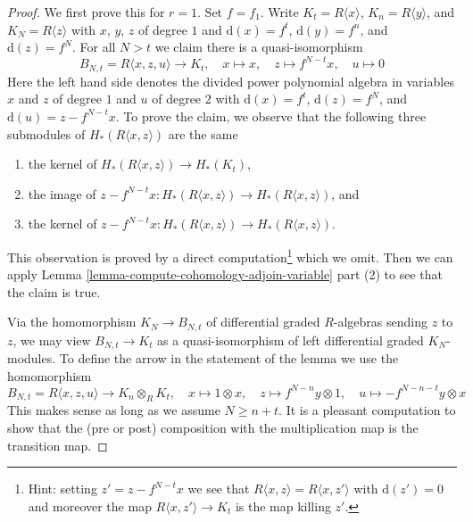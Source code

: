 \documentclass{stacks-project}
\theoremstyle{plain}
\theoremstyle{definition}
\theoremstyle{remark}
\numberwithin{equation}{subsection}
\begin{document}
\begin{proof}
We first prove this for $r = 1$. Set $f = f_1$.
Write $K_t = R\langle x \rangle$,
$K_n = R\langle y \rangle$, and $K_N = R\langle z \rangle$
with $x$, $y$, $z$ of degree $1$ and
$\text{d}(x) = f^t$, $\text{d}(y) = f^n$, and
$\text{d}(z) = f^N$. For all $N > t$ we claim there is a quasi-isomorphism
$$
B_{N, t} = R\langle x, z, u \rangle
\longrightarrow
K_t,\quad
x \mapsto x,\quad
z \mapsto f^{N - t}x,\quad
u \mapsto 0
$$
Here the left hand side denotes the divided power polynomial algebra
in variables $x$ and $z$ of degree $1$ and $u$ of degree $2$ with
$\text{d}(x) = f^t$, $\text{d}(z) = f^N$, and
$\text{d}(u) = z - f^{N - t}x$. To prove the claim,
we observe that the following three submodules of
$H_*(R\langle x, z\rangle)$ are the same
\begin{enumerate}
\item the kernel of $H_*(R\langle x, z\rangle) \to H_*(K_t)$,
\item the image of
$z - f^{N - t}x : H_*(R\langle x, z\rangle) \to H_*(R\langle x, z\rangle)$, and
\item the kernel of
$z - f^{N - t}x : H_*(R\langle x, z\rangle) \to H_*(R\langle x, z\rangle)$.
\end{enumerate}
This observation is proved by a direct computation\footnote{Hint: setting
$z' = z - f^{N - t}x$ we see that
$R\langle x, z\rangle = R\langle x, z'\rangle$ with $\text{d}(z') = 0$
and moreover the map $R\langle x, z'\rangle \to K_t$ is
the map killing $z'$.} which we omit. Then we can
apply Lemma \ref{lemma-compute-cohomology-adjoin-variable} part (2)
to see that the claim is true.

\medskip\noindent
Via the homomorphism $K_N \to B_{N, t}$ of differential graded $R$-algebras
sending $z$ to $z$, we may view $B_{N, t} \to K_t$ as a quasi-isomorphism of
left differential graded $K_N$-modules. To define the arrow in the statement
of the lemma we use the homomorphism
$$
B_{N, t} = R\langle x, z, u \rangle \to K_n \otimes_R K_t,\quad
x \mapsto 1 \otimes x,\quad
z \mapsto f^{N - n}y \otimes 1,\quad
u \mapsto - f^{N - n - t}y \otimes x
$$
This makes sense as long as we assume $N \geq n + t$. It is a
pleasant computation to show that the (pre or post) composition with
the multiplication map is the transition map.


\end{proof}
\end{document}

